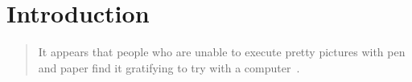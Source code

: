 \newcommand{\bq}{}
\newcommand{\dpic}{{\bq dpic}\xspace}
\newcommand{\Dpic}{{\bq Dpic}\xspace}
\newcommand{\dvips}{{\bq dvips}\xspace}
\newcommand{\gpic}{{\bq gpic}\xspace}
\newcommand{\Gpic}{{\bq Gpic}\xspace}
\newcommand{\groff}{{\bq groff}\xspace}
\newcommand{\latex}{\LaTeX\xspace}
\newcommand{\linespec}{{\sl linespec}\xspace}
\newcommand{\MetaPost}{{\bq MetaPost}\xspace}
\newcommand{\Mfour}{{\bq m4}\xspace}
\newcommand{\mfpic}{{\bq mfpic}\xspace}
\newcommand{\PDF}{{\bq PDF}\xspace}
\newcommand{\pic}{{\bq pic}\xspace}
\newcommand{\Pic}{{\bq Pic}\xspace}
\newcommand{\Postscript}{{\bq Postscript}\xspace}
\newcommand{\PSTricks}{{\bq PSTricks}\xspace}
\newcommand{\SVG}{{\bq SVG}\xspace}
\newcommand{\tex}{\TeX\xspace}
\newcommand{\Textregistered}{\textregistered\xspace}
\newcommand{\TPGF}{{\bq Ti{\it k}z~PGF}\xspace}
\newcommand{\Tikz}{{\bq Ti{\it k}z}\xspace}
\newcommand{\tpic}{{\bq tpic}\xspace}
\newcommand{\xfig}{{\bq xfig}\xspace}
\newcommand{\Xfig}{{\bq Xfig}\xspace}
%
\newcommand{\xection}[1]{\section[\texorpdfstring{#1\ \dotfill}{#1}]{#1}}
\newcommand{\NVL}{\\\hspace*{\parindent}}
\newcommand{\brtt}{\hfill\break\hspace*\parindent}
\newcommand{\lbr}{{\tt\char123}}
\newcommand{\rbr}{{\tt\char125}}
\newcommand{\bsl}{{\tt\char92}}
\newcommand{\SR}[1]{\hyperref[#1]{Section~\ref*{#1}}}
\newcommand{\PR}[1]{\hyperref[#1]{page~\pageref*{#1}}}
\newcommand{\FR}[1]{\hyperref[#1]{Figure~\ref*{#1}}}
\newcommand{\FRS}[1]{\hyperref[#1]{Figures~\ref*{#1}}}
\newcommand{\MR}[2]{\hyperref[#1]{#2}}
\newcommand{\REF}[1]{\hyperref[#1]{\ref*{#1}}}
\newcommand{\LQ}{\char96}
\newcommand{\RQ}{\char39}
%
\newcommand{\Example}[1]{\vspace{\parsep}\noindent {\bf Example #1:}}
%
%
\xection{Introduction\label{Introduction:}}
   \begin{quotation}\noindent
   It appears that people
   who are unable to execute pretty pictures with pen and paper find it
   gratifying to try with a computer~\cite{Landauer95}.
   \end{quotation}

